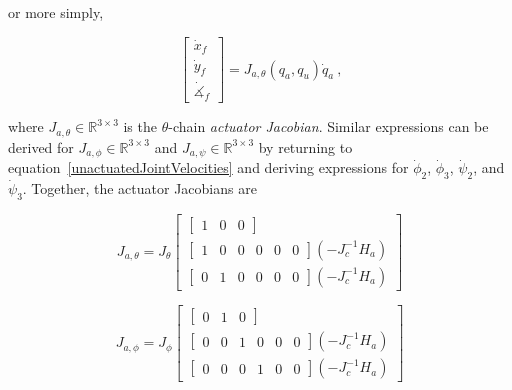 \documentclass{report}
\begin{document}
or more simply,

\begin{equation} \label{actuatorJacobian}
\begin{bmatrix}
\dot{x}_{f}\\
\dot{y}_{f}\\
\dot{\measuredangle}_{f}
\end{bmatrix} = J_{a,\theta}\left(q_{a},q_{u}\right)\dot{q}_{a}\ \text{,}
\end{equation}

where $J_{a,\theta} \in \mathbb{R}^{3\times 3}$ is the $\theta$-chain \textit{actuator Jacobian}. Similar expressions can be derived for $J_{a,\phi} \in \mathbb{R}^{3\times 3}$ and $J_{a,\psi} \in \mathbb{R}^{3\times 3}$ by returning to equation~\ref{unactuatedJointVelocities} and deriving expressions for $\dot{\phi}_{2}$, $\dot{\phi}_{3}$, $\dot{\psi}_{2}$, and $\dot{\psi}_{3}$. Together, the actuator Jacobians are

\begin{equation}
J_{a,\theta} = J_{\theta}
\begin{bmatrix}
\begin{bmatrix}1 & 0 & 0 \end{bmatrix}\\
\begin{bmatrix}
1 & 0 & 0 & 0 & 0 & 0
\end{bmatrix}\left(-J_{c}^{-1}H_{a}\right)\\
\begin{bmatrix}
0 & 1 & 0 & 0 & 0 & 0
\end{bmatrix}\left(-J_{c}^{-1}H_{a}\right)
\end{bmatrix}
\end{equation}

\begin{equation}
J_{a,\phi} = J_{\phi}\begin{bmatrix}
\begin{bmatrix}0 & 1 & 0 \end{bmatrix}\\
\begin{bmatrix}
0 & 0 & 1 & 0 & 0 & 0
\end{bmatrix}\left(-J_{c}^{-1}H_{a}\right)\\
\begin{bmatrix}
0 & 0 & 0 & 1 & 0 & 0
\end{bmatrix}\left(-J_{c}^{-1}H_{a}\right)
\end{bmatrix}
\end{equation}
\end{document}
